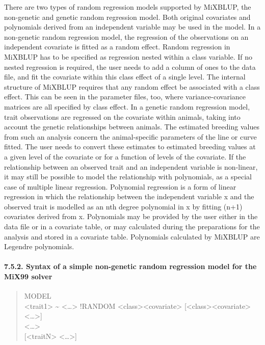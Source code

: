 There are two types of random regression models supported by MiXBLUP,
the non-genetic and genetic random regression model. Both original
covariates and polynomials derived from an independent variable may be
used in the model. In a non-genetic random regression model, the
regression of the observations on an independent covariate is fitted as
a random effect. Random regression in MiXBLUP has to be specified as
regression nested within a class variable. If no nested regression is
required, the user needs to add a column of ones to the data file, and
fit the covariate within this class effect of a single level. The
internal structure of MiXBLUP requires that any random effect be
associated with a class effect. This can be seen in the parameter files,
too, where variance-covariance matrices are all specified by class
effect. In a genetic random regression model, trait observations are
regressed on the covariate within animals, taking into account the
genetic relationships between animals. The estimated breeding values
from such an analysis concern the animal-specific parameters of the line
or curve fitted. The user needs to convert these estimates to estimated
breeding values at a given level of the covariate or for a function of
levels of the covariate. If the relationship between an observed trait
and an independent variable is non-linear, it may still be possible to
model the relationship with polynomials, as a special case of multiple
linear regression. Polynomial regression is a form of linear regression
in which the relationship between the independent variable x and the
observed trait is modelled as an nth degree polynomial in x by fitting
(n+1) covariates derived from x. Polynomials may be provided by the user
either in the data file or in a covariate table, or may calculated
during the preparations for the analysis and stored in a covariate
table. Polynomials calculated by MiXBLUP are Legendre polynomials.

\paragraph{7.5.2. Syntax of a simple non-genetic random regression model
for the MiX99 solver}\label{Stat22}

\begin{quote}
MODEL\\
\textless trait1\textgreater{} \textasciitilde{}
\textless\ldots\textgreater{} !RANDOM
\textless class\textgreater*\textless covariate\textgreater{}
{[}\textless class\textgreater*\textless covariate\textgreater{}
\textless\ldots\textgreater{]}\\
\textless\ldots\textgreater{}\\
{[}\textless traitN\textgreater{} \textless\ldots\textgreater{]}
\end{quote}

